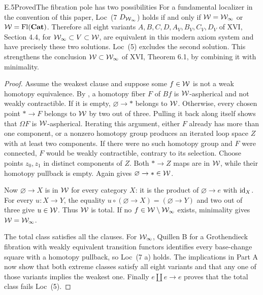 \begin{claim}{E.5}{Proved}{The fibration pole has two possibilities}
For a fundamental localizer in the convention of this paper,
Loc~(7 $D_{\mathcal{W}_{\infty}}$) holds if and only if
$\mathcal{W}=\mathcal{W}_{\infty}$ or $\mathcal{W}=\operatorname{Fl}(\mathbf{Cat})$. Therefore all eight variants
$A,B,C,D,A_V,B_V,C_V,D_V$ of XVI, Section 4.4, for
$\mathcal{W}_{\infty}\subset V\subset\mathcal{W}$, are equivalent in this modern
axiom system and have precisely these two solutions.
Loc~(5) excludes the second solution. This strengthens the
conclusion $\mathcal{W}\subset\mathcal{W}_{\infty}$ of XVI, Theorem 6.1, by
combining it with minimality.
\end{claim}
\begin{proof}
Assume the weakest clause and suppose some $f\in\mathcal{W}$ is not
a weak homotopy equivalence. By , a homotopy
fiber $F$ of $Bf$ is $\mathcal{W}$-aspherical and not weakly
contractible. If it is empty, $\varnothing\to*$ belongs to
$\mathcal{W}$. Otherwise, every chosen point $*\to F$ belongs to
$\mathcal{W}$ by two out of three. Pulling it back along itself shows
that $\Omega F$ is $\mathcal{W}$-aspherical. Iterating this argument,
either $F$ already has more than one component, or a nonzero
homotopy group produces an iterated loop space $Z$ with at
least two components. If there were no such homotopy group
and $F$ were connected, $F$ would be weakly contractible,
contrary to its selection. Choose points $z_0,z_1$ in
distinct components of $Z$. Both $*\to Z$ maps are in
$\mathcal{W}$, while their homotopy pullback is empty. Again
 gives $\varnothing\to*\in\mathcal{W}$.

Now $\varnothing\to X$ is in $\mathcal{W}$ for every category $X$:
it is the product of $\varnothing\to e$ with $\mathrm{id}_X$.
For every $u:X\to Y$, the equality
$u\circ(\varnothing\to X)=(\varnothing\to Y)$ and two
out of three give $u\in\mathcal{W}$. Thus $\mathcal{W}$ is total.
If no $f\in\mathcal{W}\setminus\mathcal{W}_{\infty}$ exists, minimality gives
$\mathcal{W}=\mathcal{W}_{\infty}$.

The total class satisfies all the clauses. For $\mathcal{W}_{\infty}$,
Quillen B for a Grothendieck fibration with weakly equivalent
transition functors identifies every base-change square with
a homotopy pullback, so Loc~(7 a) holds. The implications in
Part A now show that both extreme classes satisfy all eight
variants and that any one of those variants implies the
weakest one. Finally $e\amalg e\to e$ proves that the total
class fails Loc~(5).
\end{proof}

